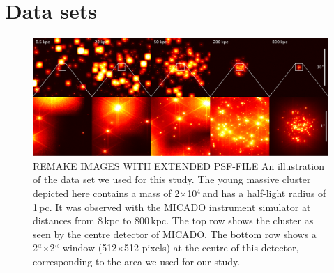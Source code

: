 \section{Data sets}
\label{sec:observations}


\begin{figure}

    \centering
    \includegraphics[width=\textwidth]{images/5_clusters.pdf}

    \caption{\rewrite REMAKE IMAGES WITH EXTENDED PSF-FILE
    An illustration of the data set we used for this study. The young massive cluster depicted here contains a mass of 2$\times$10$^4$\,\msun and has a half-light radius of 1\,pc. It was observed with the MICADO instrument simulator at distances from 8\,kpc to 800\,kpc. The top row shows the cluster as seen by the centre detector of MICADO. The bottom row shows a 2``$\times$2`` window (512$\times$512 pixels) at the centre of this detector, corresponding to the area we used for our study.}
    
    \label{fig:5_clusters}
    
\end{figure}


